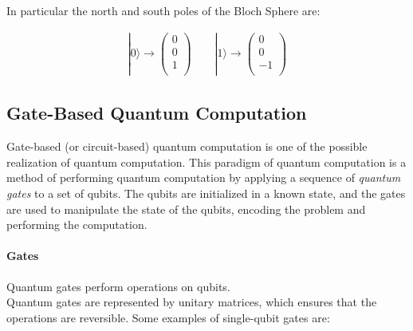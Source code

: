 In particular the north and south poles of the Bloch Sphere are:

\begin{align}
    | 0 \rangle \rightarrow 
    \begin{pmatrix}
        0 \\
        0 \\
        1 \\
    \end{pmatrix}
    \qquad
    | 1 \rangle \rightarrow 
    \begin{pmatrix}
        0 \\
        0 \\
        - 1 \\
    \end{pmatrix}
\end{align}


\subsection{Gate-Based Quantum Computation}

Gate-based (or circuit-based) quantum computation is one of the possible realization of quantum computation.
This paradigm of quantum computation is a method of performing quantum computation by applying a sequence of \textit{quantum gates} to a set of qubits. 
The qubits are initialized in a known state, and the gates are used to manipulate the state of the qubits, encoding the problem and 
performing the computation.

\paragraph*{Gates}

Quantum gates perform operations on qubits.\\
Quantum gates are represented by unitary matrices, which ensures that the operations are reversible.
Some examples of single-qubit gates are:

